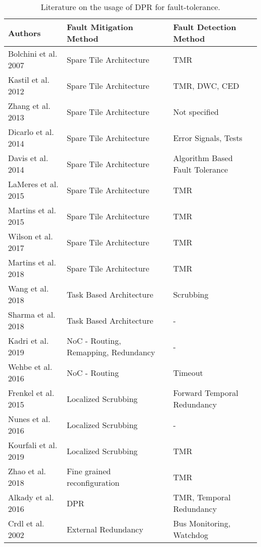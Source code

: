 \begin{table*}
    \caption{Literature on the usage of \gls{DPR} for fault-tolerance.}
    \label{tbl:literatureOverview}
    \begin{tabular*}{\textwidth}{@{\extracolsep{\fill}}lll}
        \toprule
       \textbf{Authors} & \textbf{Fault Mitigation Method} & \textbf{Fault Detection Method} \\
       \midrule
       \cite{bolchini2007} Bolchini et al. 2007             & Spare Tile Architecture      & TMR  \\
       \cite{kastil2012} Kastil et al. 2012                 & Spare Tile Architecture      & TMR, DWC, CED  \\
       \cite{zhang2013} Zhang et al. 2013                   & Spare Tile Architecture      & Not specified \\
       \cite{dicarlo2014} Dicarlo et al. 2014               & Spare Tile Architecture      & Error Signals, Tests \\
       \cite{davis2014} Davis et al. 2014                   & Spare Tile Architecture      & Algorithm Based Fault Tolerance \\
       \cite{lameres_radsat_2015} LaMeres et al. 2015       & Spare Tile Architecture      & TMR  \\
       \cite{martins_tmr_2015} Martins et al. 2015          & Spare Tile Architecture      & TMR  \\
       \cite{wilson_hybrid_2017} Wilson et al. 2017         & Spare Tile Architecture      & TMR  \\
       \cite{martins_dynamic_2018} Martins et al. 2018      & Spare Tile Architecture      & TMR  \\
       \cite{wang_dynamic_2018} Wang et al. 2018            & Task Based Architecture      & Scrubbing \\
       \cite{sharma_run-time_2018} Sharma et al. 2018       & Task Based Architecture      & - \\
       \cite{kadri_survey_2019} Kadri et al. 2019           & NoC - Routing, Remapping, Redundancy                        & - \\
       \cite{wehbe_secure_2016} Wehbe et al. 2016           & NoC - Routing               & Timeout\\
       \cite{frenkel2015} Frenkel et al. 2015               & Localized Scrubbing       & Forward Temporal Redundancy \\
       \cite{nunes_improving_2016} Nunes et al. 2016        & Localized Scrubbing         & - \\
       \cite{kourfali2019} Kourfali et al. 2019             & Localized Scrubbing           & TMR \\
       \cite{zhao_fine-grained_2018} Zhao et al. 2018       & Fine grained reconfiguration & TMR \\
       \cite{alkady_integration_2016} Alkady et al. 2016    & \gls{DPR}             & TMR, Temporal Redundancy \\
       \cite{crdl_fail-safe_2002} Crdl et al. 2002          & External Redundancy           & Bus Monitoring, Watchdog \\
       \bottomrule
    \end{tabular*}
\end{table*}

